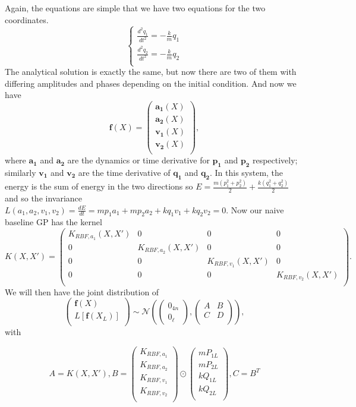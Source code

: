 \documentclass{statsmsc}
\begin{document}
Again, the equations are simple that we have two equations for the two coordinates.
$$
\begin{cases}
    \frac{d^2{q_1}}{dt^2} = -\frac{k}{m}q_1\\
    \frac{d^2{q_2}}{dt^2} = -\frac{k}{m}q_2\\
\end{cases}
$$
The analytical solution is exactly the same, but now there are two of them with differing amplitudes and phases depending on the initial condition. 
And now we have $$\mathbf{f}(X)=\begin{pmatrix}
    \mathbf{a_1}(X)\\
    \mathbf{a_2}(X)\\
    \mathbf{v_1}(X)\\
    \mathbf{v_2}(X)\\
\end{pmatrix},$$
where $\mathbf{a_1}$ and $\mathbf{a_2}$ are the dynamics or time derivative for $\mathbf{p_1}$ and $\mathbf{p_2}$ respectively; similarly $\mathbf{v_1}$ and $\mathbf{v_2}$ are the time derivative of $\mathbf{q_1}$ and $\mathbf{q_2}$.
In this system, the energy is the sum of energy in the two directions so $E=\frac{m(p_1^2+p_2^2)}{2}+\frac{k(q_1^2+q_2^2)}{2}$ and so the invariance $L(a_1, a_2, v_1, v_2)=\frac{dE}{dt}=mp_1a_1+mp_2a_2+kq_1v_1+kq_2v_2=0.$
Now our naive baseline GP has the kernel
$$
K(X,X')=\begin{pmatrix}
K_{RBF,a_1}(X,X') & 0 & 0 & 0 \\
0 & K_{RBF,a_2}(X,X') & 0 & 0 \\
0 & 0 & K_{RBF,v_1}(X,X') & 0 \\
0 & 0 & 0 & K_{RBF,v_2}(X,X') \\
\end{pmatrix}.
$$
We will then have the joint distribution of
$$
\begin{pmatrix}
    \mathbf{f}(X)\\L[\mathbf{f}(X_L)]\\
\end{pmatrix}
\sim\mathcal{N}
\left(
\begin{pmatrix}
    0_{4n} \\ 0_{\ell}
\end{pmatrix},
\begin{pmatrix}
    A & B \\
    C & D\\
\end{pmatrix}
\right),
$$
with 

$$
A=K(X, X'), 
B=\begin{pmatrix}
    K_{RBF, a_1}\\
    K_{RBF, a_2}\\
    K_{RBF, v_1}\\
    K_{RBF, v_2}\\
\end{pmatrix}\odot
\begin{pmatrix}
mP_{1L}  \\
mP_{2L}  \\
kQ_{1L}  \\
kQ_{2L}  \\
\end{pmatrix},
C=B^T 
$$
\end{document}
